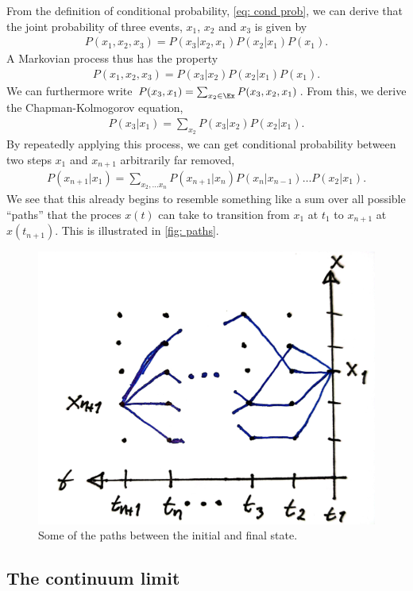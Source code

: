 From the definition of conditional probability, \autoref{eq: cond prob}, we can derive that the joint probability of three events, $x_1$, $x_2$ and $x_3$ is given by
%
\begin{align}
    P(x_1, x_2, x_3) = P(x_3|x_2,x_1)P(x_2|x_1)P(x_1).
\end{align}
%
A Markovian process thus has the property
%
\begin{align}
    P(x_1, x_2, x_3) = P(x_3|x_2)P(x_2|x_1)P(x_1).
\end{align}
%
We can furthermore write $P(x_3, x_1) = \sum_{x_2 \in \Ex} P(x_3, x_2, x_1)$.
From this, we derive the Chapman-Kolmogorov equation,
%
\begin{align}\label{eq: chapman kolmogorov}
    P(x_3|x_1) = \sum_{x_2} P(x_3|x_2) P(x_2|x_1).
\end{align}
%
By repeatedly applying this process, we can get conditional probability between two steps $x_1$ and $x_{n+1}$ arbitrarily far removed,
%
\begin{align}\label{eq: cond prob markov x0 given xn}
    P(x_{n+1}|x_1) 
    = \sum_{ x_2, \dots x_n}
    P(x_{n+1}|x_n) P(x_n| x_{n-1})\dots P(x_2|x_1).
\end{align}
%
We see that this already begins to resemble something like a sum over all possible ``paths'' that the proces $x(t)$ can take to transition from $x_1$ at $t_1$ to $x_{n+1}$ at $x(t_{n+1})$.
This is illustrated in \autoref{fig: paths}.


\begin{figure}[!htb]
    \centering
    \includegraphics[width=.4\textwidth]{fig/fig2.jpg}
    \caption{Some of the paths between the initial and final state.}
    \label{fig: paths}
\end{figure}


\subsection*{The continuum limit}

